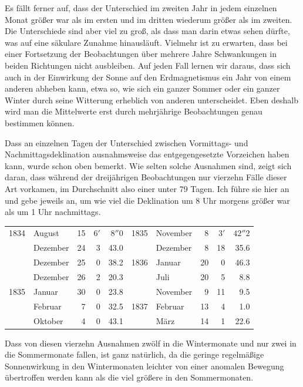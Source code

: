 Es fällt ferner auf, dass der Unterschied im zweiten Jahr in jedem einzelnen Monat größer war als im ersten und im dritten wiederum größer als im zweiten. Die Unterschiede sind aber viel zu groß, als dass man darin etwas sehen dürfte, was auf eine säkulare Zunahme hinausläuft. Vielmehr ist zu erwarten, dass bei einer Fortsetzung der Beobachtungen über mehrere Jahre Schwankungen in beiden Richtungen nicht ausbleiben. Auf jeden Fall lernen wir daraus, dass sich auch in der Einwirkung der Sonne auf den Erdmagnetismus ein Jahr von einem anderen abheben kann, etwa so, wie sich ein ganzer Sommer oder ein ganzer Winter durch seine Witterung erheblich von anderen unterscheidet. Eben deshalb wird man die Mittelwerte erst durch mehrjährige Beobachtungen genau bestimmen können.

Dass an einzelnen Tagen der Unterschied zwischen Vormittags- und Nachmittagsdeklination ausnahmsweise das entgegengesetzte Vorzeichen haben kann, wurde schon oben bemerkt. Wie selten solche Ausnahmen sind, zeigt sich daran, dass während der dreijährigen Beobachtungen nur vierzehn Fälle dieser Art vorkamen, im Durchschnitt also einer unter 79 Tagen. Ich führe sie hier an und gebe jeweils an, um wie viel die Deklination um 8 Uhr morgens größer war als um 1 Uhr nachmittags.
\begin{center}\small
\begin{tabular}{rlr|rr||rlr|rr}
1834&August&15&$6'$&$8''0$&1835&November&8&$3'$&$42''2$\\
&Dezember&24&3&43.0&&Dezember&8&18&35.6\\
&Dezember&25&0&38.2&1836&Januar&20&0&46.3\\
&Dezember&26&2&20.3&&Juli&20&5&8.8\\
1835&Januar&30&0&23.8&&November&9&11&9.5\\
&Februar&7&0&32.5&1837&Februar&13&4&1.0\\
&Oktober&4&0&43.1&&März&14&1&22.6
\end{tabular}
\end{center}
Dass von diesen vierzehn Ausnahmen zwölf in die Wintermonate und nur zwei in die Sommermonate fallen, ist ganz natürlich, da die geringe
regelmäßige Sonnenwirkung in den Wintermonaten leichter von einer anomalen Bewegung übertroffen werden kann als die viel größere in den Sommermonaten.

